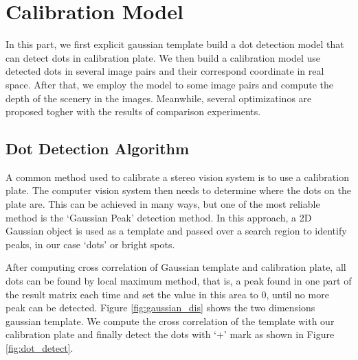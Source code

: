 \chapter{Calibration Model}

In this part, we first explicit gaussian template build a dot detection model that can detect dots in calibration plate. We then build a calibration model use detected dots in several image pairs and their correspond coordinate in real space. After that, we employ the model to some image pairs and compute the depth of the scenery in the images. Meanwhile, several optimizatinos are proposed togher with the results of comparison experiments.

\section{Dot Detection Algorithm}

A common method used to calibrate a stereo vision system is to use a calibration plate. The computer vision system then needs to determine where the dots on the plate are. This can be achieved in many ways, but one of the most reliable method is the ‘Gaussian Peak’ detection method. In this approach, a 2D Gaussian object is used as a template and passed over a search region to identify peaks, in our case ‘dots’ or bright spots. 

After computing cross correlation of Gaussian template and calibration plate, all dots can be found by local maximum method, that is, a peak found in one part of the result matrix each time and set the value in this area to 0, until no more peak can be detected. Figure \ref{fig:gaussian_dis} shows the two dimensions gaussian template. We compute the cross correlation of the template with our calibration plate and finally detect the dots with `+' mark as shown in Figure \ref{fig:dot_detect}.

